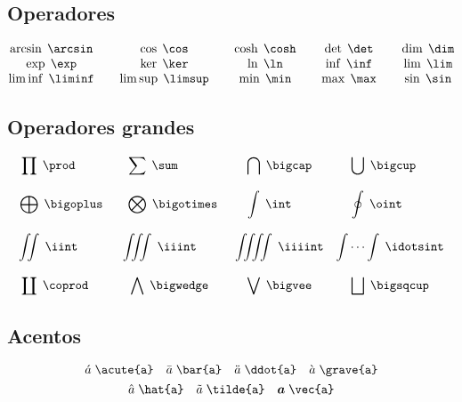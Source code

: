 \subsection{Operadores}
\begin{equation*}
    \begin{matrix}
    \arcsin \; \verb|\arcsin  | & \cos \; \verb|\cos  | & \cosh \; \verb|\cosh  | & \det \; \verb|\det  | & \dim \; \verb|\dim| \\ 
    \exp \; \verb|\exp  | & \ker \; \verb|\ker  | & \ln \; \verb|\ln  | & \inf \; \verb|\inf  | & \lim \; \verb|\lim| \\ 
    \liminf \; \verb|\liminf  | & \limsup \; \verb|\limsup  | & \min \; \verb|\min  | & \max \; \verb|\max  | & \sin \; \verb|\sin|
    \end{matrix} 
\end{equation*}

\subsection{Operadores grandes}
\begin{equation*}
    \begin{matrix}
    \displaystyle \prod \; \verb|\prod     | & \displaystyle \sum \; \verb|\sum      | & \displaystyle \bigcap \; \verb|\bigcap| & \displaystyle \bigcup \; \verb|\bigcup  | \\ 
    \\
    \displaystyle \bigoplus \; \verb|\bigoplus | & \displaystyle \bigotimes \; \verb|\bigotimes| & \displaystyle \int \; \verb|\int   | & \displaystyle \oint \; \verb|\oint    | \\ 
    \\
    \displaystyle \iint \; \verb|\iint     | & \displaystyle \iiint \; \verb|\iiint    | & \displaystyle \iiiint \; \verb|\iiiint| & \displaystyle \idotsint \; \verb|\idotsint| \\
    \\
    \displaystyle \coprod \; \verb|\coprod   | & \displaystyle \bigwedge \; \verb|\bigwedge | & \displaystyle \bigvee \; \verb|\bigvee| & \displaystyle \bigsqcup \; \verb|\bigsqcup|
    \end{matrix} 
\end{equation*}
\subsection{Acentos}
\begin{equation*}
    \acute{a} \; \verb|\acute{a}| \quad \bar{a} \; \verb|\bar{a}| \quad \ddot{a} \; \verb|\ddot{a}| \quad \grave{a} \; \verb|\grave{a}|
\end{equation*}
\begin{equation*}
    \hat{a} \; \verb|\hat{a}| \quad \tilde{a} \; \verb|\tilde{a}| \quad \vec{a} \; \verb|\vec{a}|
\end{equation*}

